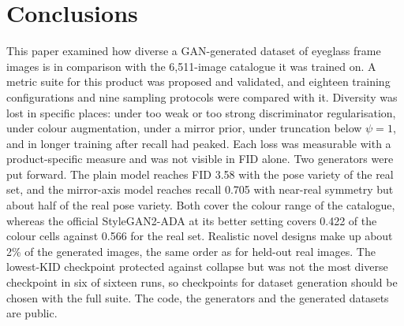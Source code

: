\documentclass[electronics,article,submit,pdftex,moreauthors]{Definitions/mdpi}
\begin{document}
\section{Conclusions}
\label{sec:conclusions}

This paper examined how diverse a GAN-generated dataset of eyeglass frame
images is in comparison with the 6,511-image catalogue it was trained on. A
metric suite for this product was proposed and validated, and eighteen
training configurations and nine sampling protocols were compared with it.
Diversity was lost in specific places: under too weak or too strong
discriminator regularisation, under colour augmentation, under a mirror
prior, under truncation below $\psi = 1$, and in longer training after recall
had peaked. Each loss was measurable with a product-specific measure and was
not visible in FID alone. Two generators were put forward. The plain model
reaches FID 3.58 with the pose variety of the real set, and the mirror-axis
model reaches recall 0.705 with near-real symmetry but about half of the
real pose variety. Both cover the colour range of the catalogue, whereas the
official StyleGAN2-ADA at its better setting covers 0.422 of the colour cells
against 0.566 for the real set. Realistic novel designs make up about 2\% of
the generated images, the same order as for held-out real images. The
lowest-KID checkpoint protected against collapse but was not the most diverse
checkpoint in six of sixteen runs, so checkpoints for dataset generation
should be chosen with the full suite. The code, the generators and the
generated datasets are public.


%

\vspace{6pt} 



\end{document}
